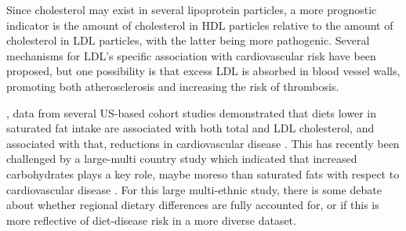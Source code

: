 \documentclass{tufte-handout}
\begin{document}
Since cholesterol may exist in several lipoprotein particles, a more prognostic indicator is the amount of cholesterol in HDL particles relative to the amount of cholesterol in LDL particles, with the latter being more pathogenic.  Several mechanisms for LDL's specific association with cardiovascular risk have been proposed, but one possibility is that excess LDL is absorbed in blood vessel walls, promoting both atherosclerosis and increasing the risk of thrombosis.

, data from several US-based cohort studies demonstrated that diets lower in saturated fat intake are associated with both total and LDL cholesterol, and associated with that, reductions in cardiovascular disease \citep{Anderson1987,Wang2016b}.  This has recently been challenged by a large-multi country study which indicated that increased carbohydrates plays a key role, maybe moreso than saturated fats with respect to cardiovascular disease \citep{Dehghan2017}.  For this large multi-ethnic study, there is some debate about whether regional dietary differences are fully accounted for, or if this is more reflective of diet-disease risk in a more diverse dataset.  



\end{document}
